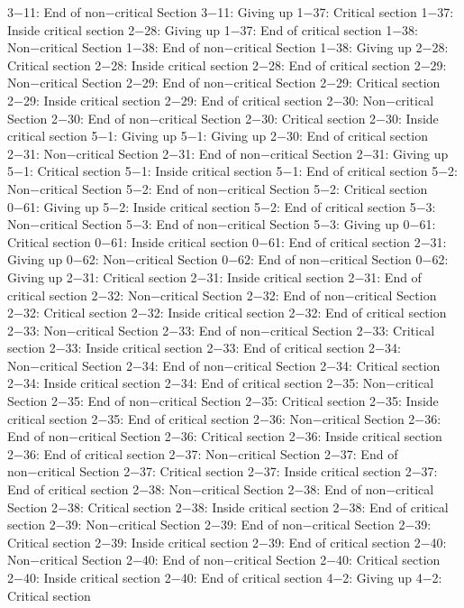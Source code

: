 3−11: End of non−critical Section
3−11: Giving up
1−37: Critical section
1−37: Inside critical section
2−28: Giving up
1−37: End of critical section
1−38: Non−critical Section
1−38: End of non−critical Section
1−38: Giving up
2−28: Critical section
2−28: Inside critical section
2−28: End of critical section
2−29: Non−critical Section
2−29: End of non−critical Section
2−29: Critical section
2−29: Inside critical section
2−29: End of critical section
2−30: Non−critical Section
2−30: End of non−critical Section
2−30: Critical section
2−30: Inside critical section
5−1: Giving up
5−1: Giving up
2−30: End of critical section
2−31: Non−critical Section
2−31: End of non−critical Section
2−31: Giving up
5−1: Critical section
5−1: Inside critical section
5−1: End of critical section
5−2: Non−critical Section
5−2: End of non−critical Section
5−2: Critical section
0−61: Giving up
5−2: Inside critical section
5−2: End of critical section
5−3: Non−critical Section
5−3: End of non−critical Section
5−3: Giving up
0−61: Critical section
0−61: Inside critical section
0−61: End of critical section
2−31: Giving up
0−62: Non−critical Section
0−62: End of non−critical Section
0−62: Giving up
2−31: Critical section
2−31: Inside critical section
2−31: End of critical section
2−32: Non−critical Section
2−32: End of non−critical Section
2−32: Critical section
2−32: Inside critical section
2−32: End of critical section
2−33: Non−critical Section
2−33: End of non−critical Section
2−33: Critical section
2−33: Inside critical section
2−33: End of critical section
2−34: Non−critical Section
2−34: End of non−critical Section
2−34: Critical section
2−34: Inside critical section
2−34: End of critical section
2−35: Non−critical Section
2−35: End of non−critical Section
2−35: Critical section
2−35: Inside critical section
2−35: End of critical section
2−36: Non−critical Section
2−36: End of non−critical Section
2−36: Critical section
2−36: Inside critical section
2−36: End of critical section
2−37: Non−critical Section
2−37: End of non−critical Section
2−37: Critical section
2−37: Inside critical section
2−37: End of critical section
2−38: Non−critical Section
2−38: End of non−critical Section
2−38: Critical section
2−38: Inside critical section
2−38: End of critical section
2−39: Non−critical Section
2−39: End of non−critical Section
2−39: Critical section
2−39: Inside critical section
2−39: End of critical section
2−40: Non−critical Section
2−40: End of non−critical Section
2−40: Critical section
2−40: Inside critical section
2−40: End of critical section
4−2: Giving up
4−2: Critical section
